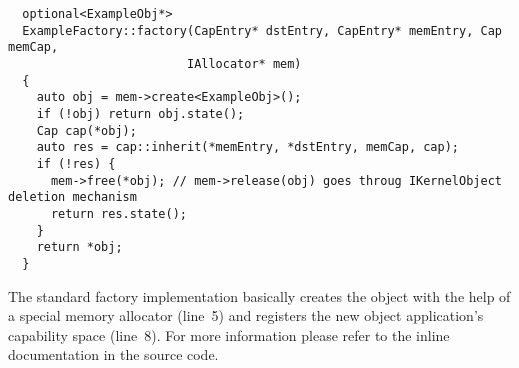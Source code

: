 \lstset{language=c++,label=lst:obj-factory}
\begin{lstlisting}
  optional<ExampleObj*>
  ExampleFactory::factory(CapEntry* dstEntry, CapEntry* memEntry, Cap memCap,
                         IAllocator* mem)
  {
    auto obj = mem->create<ExampleObj>();
    if (!obj) return obj.state();
    Cap cap(*obj);
    auto res = cap::inherit(*memEntry, *dstEntry, memCap, cap);
    if (!res) {
      mem->free(*obj); // mem->release(obj) goes throug IKernelObject deletion mechanism
      return res.state();
    }
    return *obj;
  }
\end{lstlisting}
 
The standard factory implementation basically creates the object with the help
of a special memory allocator (line~5) and registers the new object
application's capability space (line~8). For more information please refer to
the inline documentation in the source code.
 
% 
% 


